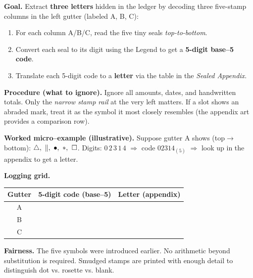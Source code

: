\documentclass[11pt]{article}
\numberwithin{equation}{section} %
\theoremstyle{plain} %
\theoremstyle{definition} %
\theoremstyle{remark} %
\begin{document}
\medskip
\noindent\textbf{Goal.} Extract \textbf{three letters} hidden in the ledger by decoding three five-stamp columns in the left gutter (labeled \textsc{A}, \textsc{B}, \textsc{C}):

\begin{enumerate}\setlength\itemsep{0.25em}
  \item For each column \textsc{A}/\textsc{B}/\textsc{C}, read the five tiny seals \emph{top-to-bottom}.
  \item Convert each seal to its digit using the Legend to get a \textbf{5-digit base--5 code}.
  \item Translate each 5-digit code to a \textbf{letter} via the table in the \emph{Sealed Appendix}.
\end{enumerate}

\medskip
\noindent\textbf{Procedure (what to ignore).} Ignore all amounts, dates, and handwritten totals. Only the \emph{narrow stamp rail} at the very left matters. If a slot shows an abraded mark, treat it as the symbol it most closely resembles (the appendix art provides a comparison row).

\medskip
\noindent\textbf{Worked micro--example (illustrative).}  
Suppose gutter \textsc{A} shows (top$\rightarrow$bottom): \(\triangle,\ \Vert,\ \bullet,\ \large\ast,\ \square\).  
Digits: \(0\,2\,3\,1\,4\) \(\Rightarrow\) code \(02314_{(5)}\) \(\Rightarrow\) look up in the appendix to get a letter.

\medskip
\noindent\textbf{Logging grid.}
\begin{center}
\begin{tabular}{c|c|c}
\textbf{Gutter} & \textbf{5-digit code (base--5)} & \textbf{Letter (appendix)} \\
\hline
A & \hspace{3.5cm} & \hspace{1.2cm} \\
B & \hspace{3.5cm} & \hspace{1.2cm} \\
C & \hspace{3.5cm} & \hspace{1.2cm} \\
\end{tabular}
\end{center}

\medskip
\noindent\textbf{Fairness.} The five symbols were introduced earlier. No arithmetic beyond substitution is required. Smudged stamps are printed with enough detail to distinguish dot vs. rosette vs. blank.
\end{document}
